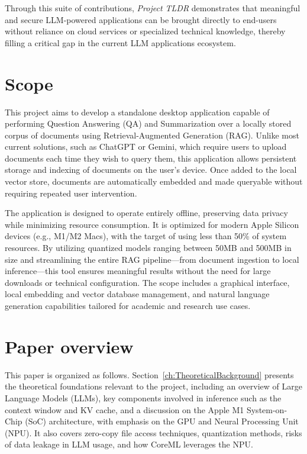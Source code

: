 Through this suite of contributions, \textit{Project TLDR} demonstrates that meaningful and secure LLM-powered applications can be brought directly to end-users without reliance on cloud services or specialized technical knowledge, thereby filling a critical gap in the current LLM applications ecosystem.


\section{Scope}
\label{sec:Scope}

This project aims to develop a standalone desktop application capable of performing Question Answering (QA) and Summarization over a locally stored corpus of documents using Retrieval-Augmented Generation (RAG). Unlike most current solutions, such as ChatGPT or Gemini, which require users to upload documents each time they wish to query them, this application allows persistent storage and indexing of documents on the user's device. Once added to the local vector store, documents are automatically embedded and made queryable without requiring repeated user intervention.

The application is designed to operate entirely offline, preserving data privacy while minimizing resource consumption. It is optimized for modern Apple Silicon devices (e.g., M1/M2 Macs), with the target of using less than 50\% of system resources. By utilizing quantized models ranging between 50MB and 500MB in size and streamlining the entire RAG pipeline—from document ingestion to local inference—this tool ensures meaningful results without the need for large downloads or technical configuration. The scope includes a graphical interface, local embedding and vector database management, and natural language generation capabilities tailored for academic and research use cases.
\section{Paper overview}
\label{sec:PaperOverview}

This paper is organized as follows. Section~\ref{ch:TheoreticalBackground} presents the theoretical foundations relevant to the project, including an overview of Large Language Models (LLMs), key components involved in inference such as the context window and KV cache, and a discussion on the Apple M1 System-on-Chip (SoC) architecture, with emphasis on the GPU and Neural Processing Unit (NPU). It also covers zero-copy file access techniques, quantization methods, risks of data leakage in LLM usage, and how CoreML leverages the NPU.

